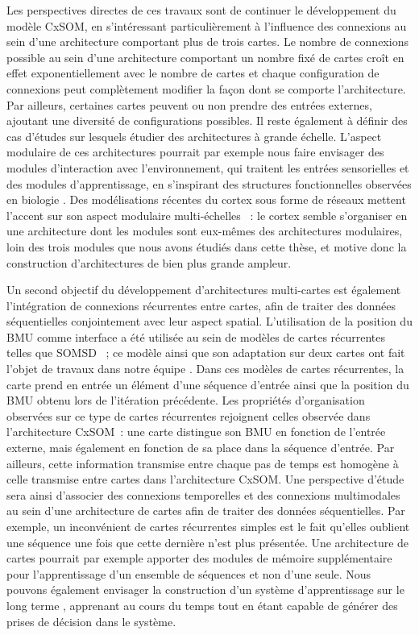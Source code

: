 Les perspectives directes de ces travaux sont de continuer le développement du modèle CxSOM, en s'intéressant particulièrement à l'influence des connexions au sein d'une architecture comportant plus de trois cartes.
Le nombre de connexions possible au sein d'une architecture comportant un nombre fixé de cartes croît en effet exponentiellement avec le nombre de cartes et chaque configuration de connexions peut complètement modifier la façon dont se comporte l'architecture. 
Par ailleurs, certaines cartes peuvent ou non prendre des entrées externes, ajoutant une diversité de configurations possibles.
Il reste également à définir des cas d'études sur lesquels étudier des architectures à grande échelle.
L'aspect modulaire de ces architectures pourrait par exemple nous faire envisager des modules d'interaction avec l'environnement, qui traitent les entrées sensorielles et des modules d'apprentissage, en s'inspirant des structures fonctionnelles observées en biologie \parencite{Ellefsen2015NeuralMH}. 
Des modélisations récentes du cortex sous forme de réseaux mettent l'accent sur son aspect modulaire multi-échelles \parencite{betzel_multi-scale_2017}~: le cortex semble s'organiser en une architecture dont les modules sont eux-mêmes des architectures modulaires, loin des trois modules que nous avons étudiés dans cette thèse, et motive donc la construction d'architectures de bien plus grande ampleur.

Un second objectif du développement d'architectures multi-cartes est également l'intégration de connexions récurrentes entre cartes, afin de traiter des données séquentielles conjointement avec leur aspect spatial. 
L'utilisation de la position du BMU comme interface a été utilisée au sein de modèles de cartes récurrentes telles que SOMSD \parencite{hagenbuchner_self-organizing_2003}~; ce modèle ainsi que son adaptation sur deux cartes ont fait l'objet de travaux dans notre équipe \parencite{baheux_towards_2014, fix20}. 
Dans ces modèles de cartes récurrentes, la carte prend en entrée un élément d'une séquence d'entrée ainsi que la position du BMU obtenu lors de l'itération précédente. 
Les propriétés d'organisation observées sur ce type de cartes récurrentes rejoignent celles observée dans l'architecture CxSOM~: une carte distingue son BMU en fonction de l'entrée externe, mais également en fonction de sa place dans la séquence d'entrée. Par ailleurs, cette information transmise entre chaque pas de temps est homogène à celle transmise entre cartes dans l'architecture CxSOM.
Une perspective d'étude sera ainsi d'associer des connexions temporelles et des connexions multimodales au sein d'une architecture de cartes afin de traiter des données séquentielles.
Par exemple, un inconvénient de cartes récurrentes simples est le fait qu'elles oublient une séquence une fois que cette dernière n'est plus présentée. Une architecture de cartes pourrait par exemple apporter des modules de mémoire supplémentaire pour l'apprentissage d'un ensemble de séquences et non d'une seule.
Nous pouvons également envisager la construction d'un système d'apprentissage \og sur le long terme \fg{}, apprenant au cours du temps tout en étant capable de générer des prises de décision dans le système.


